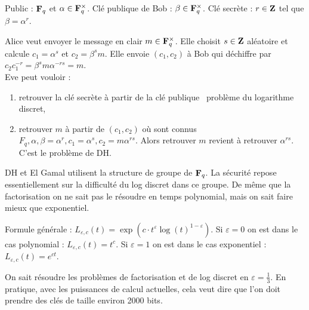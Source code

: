 	\begin{ex}
		Public : $\mathbf{F}_q$ et $\alpha \in \mathbf{F}_q^\times$.
		Clé publique de Bob : $\beta \in \mathbf{F}_q^\times$.
		Clé secrète : $r \in \mathbf{Z}$ tel que $\beta = \alpha^r$.
		
		Alice veut envoyer le message en clair $m \in \mathbf{F}_q^\times$.
		Elle choisit $s \in \mathbf{Z}$ aléatoire et calcule $c_1 = \alpha^s$ et $c_2 = \beta^s m$.
		Elle envoie $(c_1,c_2)$ à Bob qui déchiffre par $c_2 c_1^{-r} = \beta^s m \alpha^{-rs} = m$.\\
		
		\noindent Eve peut vouloir :
		\begin{enumerate}[1.]
			\item retrouver la clé secrète à partir de la clé publique \textrightarrow\ problème du logarithme discret,
			\item retrouver $m$ à partir de $(c_1,c_2)$ où sont connus $F_q, \alpha, \beta = \alpha^r, c_1 = \alpha^s, c_2 = m \alpha^{rs}$.
				Alors retrouver $m$ revient à retrouver $\alpha^{rs}$.
				C'est le problème de DH.
		\end{enumerate}
		
		DH et El Gamal utilisent la structure de groupe de $\mathbf{F}_q$.
		La sécurité repose essentiellement sur la difficulté du log discret dans ce groupe.
		De même que la factorisation on ne sait pas le résoudre en temps polynomial, mais on sait faire mieux que exponentiel.
		
		Formule générale : $L_{\varepsilon,c}(t) = \exp \left( c \cdot t^\varepsilon \log(t)^{1 - \varepsilon} \right)$.
		Si $\varepsilon = 0$ on est dans le cas polynomial : $L_{\varepsilon,c}(t) = t^c$.
		Si $\varepsilon = 1$ on est dans le cas exponentiel : $L_{\varepsilon,c}(t) = e^{ct}$.
		
		On sait résoudre les problèmes de factorisation et de log discret en $\varepsilon = \frac{1}{3}$.
		En pratique, avec les puissances de calcul actuelles, cela veut dire que l'on doit prendre des clés de taille environ 2000 bits.
	\end{ex}